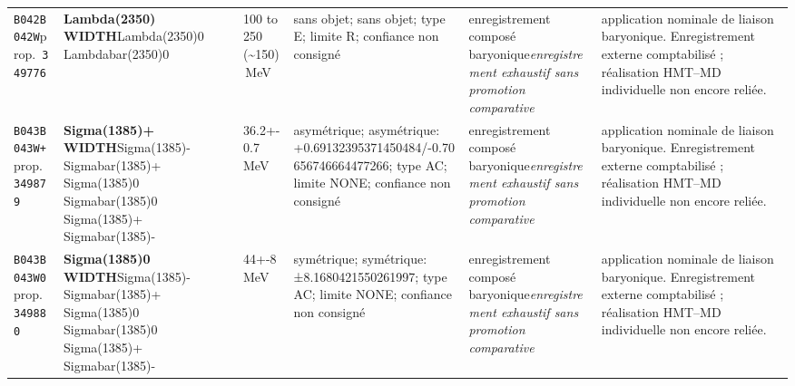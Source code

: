 \begin{landscape}
\begin{longtable}{L{1.85cm}L{4.45cm}L{2.35cm}L{4.05cm}L{3.35cm}L{7.15cm}}
\texttt{B042}\newline \texttt{B042W}\newline prop.\ \texttt{349776} & \textbf{Lambda(2350) WIDTH}\newline Lambda(2350)0 \textbar{}\allowbreak{} Lambdabar(2350)0 & 100 to 250 (\textasciitilde{}150)\,MeV & sans objet; sans objet; type E; limite R; confiance non consigné & enregistrement composé baryonique\newline \emph{enregistrement exhaustif sans promotion comparative} & application nominale de liaison baryonique. Enregistrement externe comptabilisé ; réalisation HMT--MD individuelle non encore reliée. \\
\texttt{B043}\newline \texttt{B043W+}\newline prop.\ \texttt{349879} & \textbf{Sigma(1385)+ WIDTH}\newline Sigma(1385)- \textbar{}\allowbreak{} Sigmabar(1385)+ \textbar{}\allowbreak{} Sigma(1385)0 \textbar{}\allowbreak{} Sigmabar(1385)0 \textbar{}\allowbreak{} Sigma(1385)+ \textbar{}\allowbreak{} Sigmabar(1385)- & 36.2+-0.7\,MeV & asymétrique; asymétrique: +0.69132395371450484/-0.70656746664477266; type AC; limite NONE; confiance non consigné & enregistrement composé baryonique\newline \emph{enregistrement exhaustif sans promotion comparative} & application nominale de liaison baryonique. Enregistrement externe comptabilisé ; réalisation HMT--MD individuelle non encore reliée. \\
\texttt{B043}\newline \texttt{B043W0}\newline prop.\ \texttt{349880} & \textbf{Sigma(1385)0 WIDTH}\newline Sigma(1385)- \textbar{}\allowbreak{} Sigmabar(1385)+ \textbar{}\allowbreak{} Sigma(1385)0 \textbar{}\allowbreak{} Sigmabar(1385)0 \textbar{}\allowbreak{} Sigma(1385)+ \textbar{}\allowbreak{} Sigmabar(1385)- & 44+-8\,MeV & symétrique; symétrique: ±8.1680421550261997; type AC; limite NONE; confiance non consigné & enregistrement composé baryonique\newline \emph{enregistrement exhaustif sans promotion comparative} & application nominale de liaison baryonique. Enregistrement externe comptabilisé ; réalisation HMT--MD individuelle non encore reliée. \\

\end{longtable}
\end{landscape}
